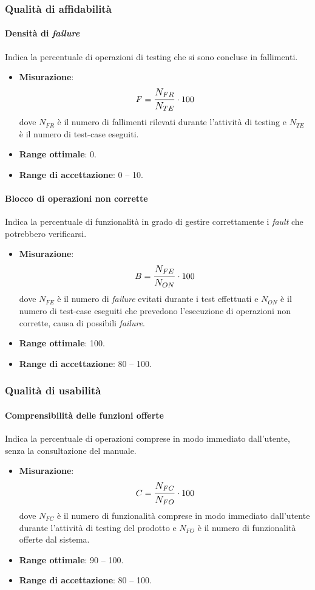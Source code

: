 \subsubsection{Qualità di affidabilità}
\paragraph{Densità di \textit{failure}}
Indica la percentuale di operazioni di testing che si sono concluse in fallimenti.

\begin{itemize}
	\item \textbf{Misurazione}: 
		$$F=\mathlarger{\frac{N_{FR}}{N_{TE}}} \cdot 100$$
	dove $N_{FR}$ è il numero di fallimenti rilevati durante l'attività di testing e $N_{TE}$ è il numero di test-case eseguiti.
	\item \textbf{Range ottimale}: 0.
	\item \textbf{Range di accettazione}: 0 -- 10.
\end{itemize}

\paragraph{Blocco di operazioni non corrette}
Indica la percentuale di funzionalità in grado di gestire correttamente i \textit{fault} che potrebbero verificarsi.
\begin{itemize}
	\item \textbf{Misurazione}: 
		$$B=\mathlarger{\frac{N_{FE}}{N_{ON}}} \cdot 100$$
	dove $N_{FE}$ è il numero di \textit{failure} evitati durante i test effettuati e $N_{ON}$ è il numero di test-case eseguiti che prevedono l'esecuzione di operazioni non corrette, causa di possibili \textit{failure}.
	\item \textbf{Range ottimale}: 100.
	\item \textbf{Range di accettazione}: 80 -- 100.
\end{itemize}

\subsubsection{Qualità di usabilità}
\paragraph{Comprensibilità delle funzioni offerte}
Indica la percentuale di operazioni comprese in modo immediato dall'utente, senza la consultazione del manuale.
\begin{itemize}
	\item \textbf{Misurazione}: 
		$$C=\mathlarger{\frac{N_{FC}}{N_{FO}}} \cdot 100$$
	dove $N_{FC}$ è il numero di funzionalità comprese in modo immediato dall'utente durante l'attività di testing del prodotto e $N_{FO}$ è il numero di funzionalità offerte dal sistema.
	\item \textbf{Range ottimale}: 90 -- 100.
	\item \textbf{Range di accettazione}: 80 -- 100.
\end{itemize}

